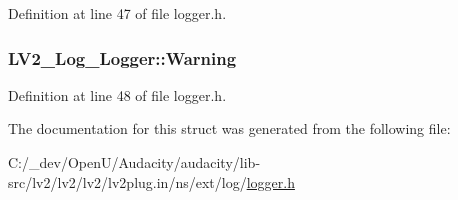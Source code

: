 Definition at line 47 of file logger.\+h.

\subsubsection[{\texorpdfstring{Warning}{Warning}}]{ L\+V2\+\_\+\+Log\+\_\+\+Logger\+::\+Warning}\hypertarget{struct_l_v2___log___logger_a28cfedfc0ad8dc71598a5cbe68801ff1}{}\label{struct_l_v2___log___logger_a28cfedfc0ad8dc71598a5cbe68801ff1}


Definition at line 48 of file logger.\+h.



The documentation for this struct was generated from the following file\+:\begin{DoxyCompactItemize}
\item 
C\+:/\+\_\+dev/\+Open\+U/\+Audacity/audacity/lib-\/src/lv2/lv2/lv2/lv2plug.\+in/ns/ext/log/\hyperlink{logger_8h}{logger.\+h}\end{DoxyCompactItemize}
